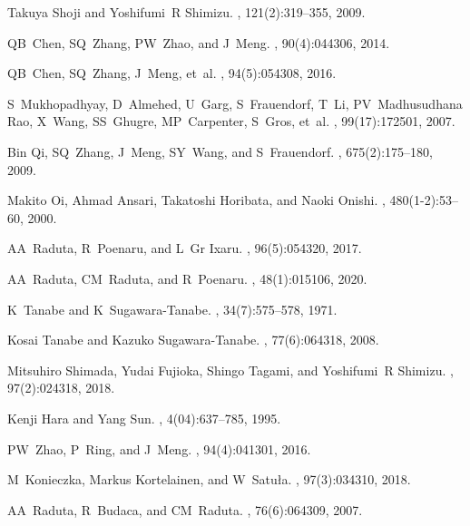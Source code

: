 \documentclass[myclassdoc,debug]{rjparticle}
\begin{document}
\begin{thebibliography}{99}
Takuya Shoji and Yoshifumi~R Shimizu.
, 121(2):319--355, 2009.

QB~Chen, SQ~Zhang, PW~Zhao, and J~Meng.
, 90(4):044306, 2014.

QB~Chen, SQ~Zhang, J~Meng, et~al.
, 94(5):054308, 2016.

S~Mukhopadhyay, D~Almehed, U~Garg, S~Frauendorf, T~Li, PV~Madhusudhana Rao,
  X~Wang, SS~Ghugre, MP~Carpenter, S~Gros, et~al.
, 99(17):172501, 2007.

Bin Qi, SQ~Zhang, J~Meng, SY~Wang, and S~Frauendorf.
, 675(2):175--180, 2009.

Makito Oi, Ahmad Ansari, Takatoshi Horibata, and Naoki Onishi.
, 480(1-2):53--60, 2000.

AA~Raduta, R~Poenaru, and L~Gr Ixaru.
, 96(5):054320, 2017.

AA~Raduta, CM~Raduta, and R~Poenaru.
,
  48(1):015106, 2020.

K~Tanabe and K~Sugawara-Tanabe.
, 34(7):575--578, 1971.

Kosai Tanabe and Kazuko Sugawara-Tanabe.
, 77(6):064318, 2008.

Mitsuhiro Shimada, Yudai Fujioka, Shingo Tagami, and Yoshifumi~R Shimizu.
, 97(2):024318, 2018.

Kenji Hara and Yang Sun.
, 4(04):637--785,
  1995.

PW~Zhao, P~Ring, and J~Meng.
, 94(4):041301, 2016.

M~Konieczka, Markus Kortelainen, and W~Satu{\l}a.
, 97(3):034310, 2018.

AA~Raduta, R~Budaca, and CM~Raduta.
, 76(6):064309, 2007.


\end{thebibliography}
\end{document}
